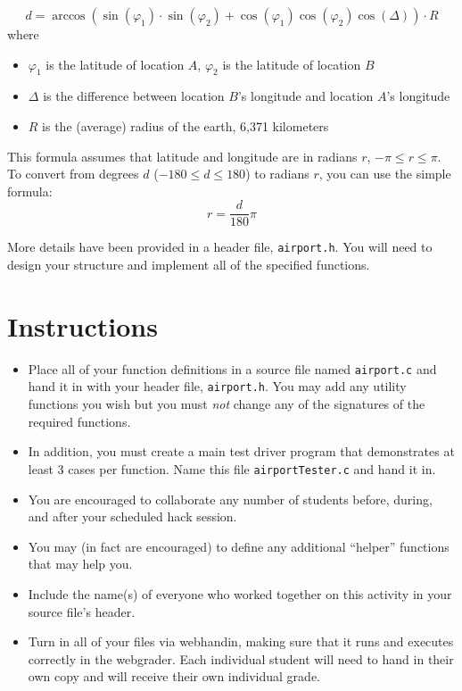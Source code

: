 \documentclass[12pt]{scrartcl}
\begin{document}
 $$d = \arccos{(\sin(\varphi_1) \cdot \sin(\varphi_2) + \cos(\varphi_1) \cos(\varphi_2) \cos(\Delta) )} \cdot R$$
where
\begin{itemize}
  \item $\varphi_1$ is the latitude of location $A$, $\varphi_2$ is the latitude of location $B$
  \item $\Delta$ is the difference between location $B$'s longitude and location $A$'s longitude
  \item $R$ is the (average) radius of the earth, 6,371 kilometers
\end{itemize}
This formula assumes that latitude and longitude are in radians 
$r$, $-\pi \leq r \leq \pi$.  To convert from degrees $d$ ($-180 \leq d \leq 180$) 
to radians $r$, you can use the simple formula:
  $$r = \frac{d}{180} \pi$$

More details have been provided in a header file, \texttt{airport.h}.
You will need to design your structure and implement all of the specified 
functions.


\section*{Instructions}

\begin{itemize}

  \item Place all of your function definitions in a source file named 
  \texttt{airport.c} and hand it in with your header file, 
  \texttt{airport.h}.  You may add any utility functions you
  wish but you must \emph{not} change any of the signatures of the required
  functions.
  
  \item In addition, you must create a main test driver program that 
  demonstrates at least 3 cases per function.  Name this file 
  \texttt{airportTester.c} and hand it in.

  \item You are encouraged to collaborate any number of students 
  before, during, and after your scheduled hack session.  

  \item You may (in fact are encouraged) to define any additional
  ``helper'' functions that may help you.

  \item Include the name(s) of everyone who worked together on
  this activity in your source file's header.

  \item Turn in all of your files via webhandin, making sure that 
  it runs and executes correctly in the webgrader.  Each individual 
  student will need to hand in their own copy and will receive 
  their own individual grade.
\end{itemize}  
\end{document}
